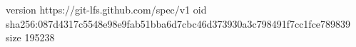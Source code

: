 version https://git-lfs.github.com/spec/v1
oid sha256:087d4317c5548e98e9fab51bba6d7cbc46d373930a3c798491f7cc1fce789839
size 195238
